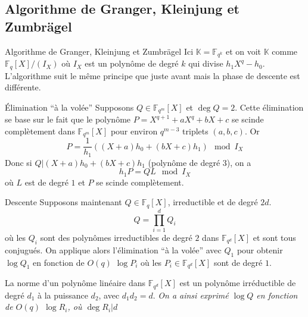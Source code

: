 \documentclass[xcolor=x11names,compress]{beamer}
\theoremstyle{break}
\theoremstyle{sc}
\theoremstyle{definition}
\theoremstyle{remark}
\begin{document}
\subsection{Algorithme de Granger, Kleinjung et Zumbrägel}

\begin{frame}{Algorithme de Granger, Kleinjung et Zumbrägel}
  Ici $\mathbb{K}=\mathbb{F}_{q^k}$ et on voit $\mathbb{K}$ comme
  $\mathbb{F}_q[X]/(I_X)$ où $I_X$ est un polynôme de degré $k$ qui divise
  $h_1X^q-h_0$. L'algorithme suit le même principe que juste avant mais la phase
  de descente est différente. 
\end{frame}

\begin{frame}{Élimination ``à la volée''}
  Supposons $Q\in \mathbb{F}_{q^m}[X]$ et $\deg Q = 2$. Cette élimination se base
  sur le fait que le polynôme $P = X^{q+1}+aX^q+bX+c$ se scinde complètement
  dans $\mathbb{F}_{q^m}[X]$ pour
  environ $q^{m-3}$ triplets $(a, b, c)$. Or 
  \[
    P = \frac{1}{h_1}((X+a)h_0 + (bX+c)h_1)\mod I_X
  \]
  Donc si $Q| (X+a)h_0 + (bX+c)h_1$ (polynôme de degré $3$), on a 
  \[
    h_1P=QL \mod I_X
  \]
  où $L$ est de degré $1$ et $P$ se scinde complètement.

\end{frame}

\begin{frame}{Descente}
  Supposons maintenant $Q\in\mathbb{F}_{q}[X]$, irreductible et de degré $2d$.
  \[
    Q=\prod_{i=1}^d Q_i
  \]
  où les $Q_i$ sont des polynômes irreductibles de degré $2$ dans
  $\mathbb{F}_{q^d}[X]$ et sont tous conjugués. On applique alors
  l'élimination ``à la volée'' avec $Q_1$ pour obtenir $\log Q_1$ en fonction
  de $O(q)$ $\log P_i$ où les $P_i\in \mathbb{F}_{q^d}[X]$ sont de degré $1$.
  
  La norme d'un polynôme linéaire dans $\mathbb{F}_{q^d}[X]$ est un polynôme
  irréductible de degré $d_1$ à la puissance $d_2$, avec $d_1d_2 = d$.
  \emph{On a ainsi exprimé $\log Q$ en fonction de $O(q)$ $\log R_i$, où $\deg
  R_i | d$}
\end{frame}

\end{document}
